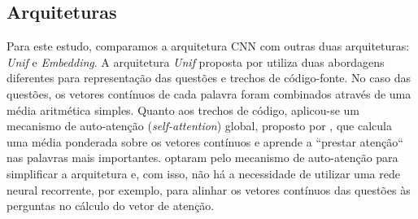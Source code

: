 \subsection{Arquiteturas}

Para este estudo, comparamos a arquitetura CNN com outras duas arquiteturas: \textit{Unif} e \textit{Embedding}. A arquitetura \textit{Unif} proposta por  utiliza duas abordagens diferentes para representação das questões e trechos de código-fonte. No caso das questões, os vetores contínuos de cada palavra foram combinados através de uma média aritmética simples. Quanto aos trechos de código, aplicou-se um mecanismo de auto-atenção (\textit{self-attention}) global, proposto por , que calcula uma média ponderada sobre os vetores contínuos e aprende a ``prestar atenção`` nas palavras mais importantes.  optaram pelo mecanismo de auto-atenção para simplificar a arquitetura e, com isso, não há a necessidade de utilizar uma rede neural recorrente, por exemplo, para alinhar os vetores contínuos das questões às perguntas no cálculo do vetor de atenção.

